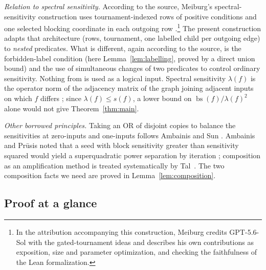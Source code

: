 \documentclass[11pt]{article}
\newcommand{\bs}{\operatorname{bs}}
\theoremstyle{definition}
\theoremstyle{remark}
\begin{document}
\emph{Relation to spectral sensitivity.}
According to the source, Meiburg's spectral-sensitivity construction uses
tournament-indexed rows of positive conditions and one selected blocking
coordinate in each outgoing row
\cite[Sections~3.1 and~5.2--5.5]{Meiburg2026}.\footnote{In the
attribution accompanying this construction, Meiburg credits GPT-5.6-Sol
with the gated-tournament ideas and describes his own contributions as
exposition, size and parameter optimization, and checking the faithfulness
of the Lean formalization.}
The present construction adapts that architecture (rows, tournament, one
labelled child per outgoing edge) to \emph{nested} predicates. What is
different, again according to the source, is the forbidden-label condition
(here Lemma~\ref{lem:labelling}, proved by a direct union bound) and the use
of simultaneous changes of two predicates to control ordinary sensitivity.
Nothing from \cite{Meiburg2026} is used as a logical input.
Spectral sensitivity \(\lambda(f)\) is the operator norm of the adjacency
matrix of the graph joining adjacent inputs on which \(f\) differs
\cite{AaronsonEtAl2021}; since \(\lambda(f)\le s(f)\), a lower bound on
\(\bs(f)/\lambda(f)^2\) alone would not give Theorem~\ref{thm:main}.

\emph{Other borrowed principles.} Taking an OR of disjoint copies to balance
the sensitivities at zero-inputs and one-inputs follows Ambainis and Sun
\cite[Section~4, Lemma~1]{AmbainisSun2011}. Ambainis and Pr\={u}sis noted
that a seed with block sensitivity greater than sensitivity squared would
yield a superquadratic power separation by iteration
\cite[Section~1]{AmbainisPrusis2014}; composition as an amplification method
is treated systematically by Tal~\cite{Tal2013}. The two composition facts
we need are proved in Lemma~\ref{lem:composition}.

\subsection{Proof at a glance}
\label{sec:glance}
\end{document}
